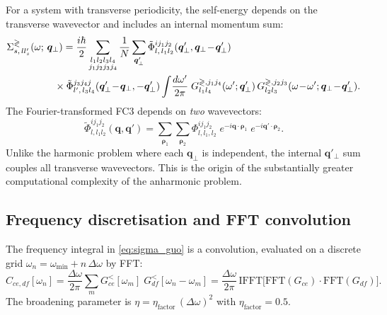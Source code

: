 \documentclass[11pt]{article}
\newcommand{\vc}[1]{\bm{#1}}
\newcommand{\vq}{\vc{q}}
\newcommand{\vrho}{\bm{\rho}}
\newcommand{\PhiT}{\tilde{\Phi}}
\newcommand{\dw}{\frac{d\omega'}{2\pi}}
\begin{document}
For a system with transverse periodicity, the self-energy depends on
the transverse wavevector and includes an internal momentum sum:
\begin{align}\label{eq:sigma_phph}
  \Sigma^{\gtrless}_{s,\,ll'_s}(&\omega;\,\vq_\perp)
  = \frac{i\hbar}{2}
    \sum_{\substack{l_1 l_2 l_3 l_4\\ j_1 j_2 j_3 j_4}}
    \frac{1}{N}\sum_{\vq'_\perp}
    \PhiT^{ij_1j_2}_{l,\,l_1 l_2}
      \!\left(\vq'_\perp,\vq_\perp\!-\!\vq'_\perp\right)
    \notag\\
  &\qquad\times
    \PhiT^{j_3j_4j}_{l',\,l_3 l_4}
      \!\left(\vq'_\perp\!-\!\vq_\perp,-\vq'_\perp\right)
    \int\!\dw\;
    G^{\gtrless,j_1j_4}_{l_1l_4}(\omega';\vq'_\perp)\,
    G^{\gtrless,j_2j_3}_{l_2l_3}
      (\omega\!-\!\omega';\vq_\perp\!-\!\vq'_\perp).
\end{align}
The Fourier-transformed FC3 depends on \emph{two} wavevectors:
\begin{equation}\label{eq:fc3_fourier}
  \PhiT^{ij_1j_2}_{l,l_{1}l_{2}}(\vq,\vq')
  = \sum_{\vrho_1}\sum_{\vrho_2}
  \Phi^{ij_1j_2}_{l,l_1,l_2}\;
  e^{-i\vq\cdot\vrho_1}\;e^{-i\vq'\cdot\vrho_2}.
\end{equation}
Unlike the harmonic problem where each $\vq_\perp$ is independent, the
internal $\vq'_\perp$ sum couples all transverse wavevectors.  This is
the origin of the substantially greater computational complexity of the
anharmonic problem.

\subsection{Frequency discretisation and FFT convolution}
\label{sec:fft}

The frequency integral in \cref{eq:sigma_guo} is a convolution,
evaluated on a discrete grid
$\omega_n = \omega_\mathrm{min} + n\,\Delta\omega$ by FFT:
\begin{equation}
  C_{ce,df}[\omega_n]
  = \frac{\Delta\omega}{2\pi}
    \sum_m
    G^<_{ce}[\omega_m]\;G^<_{df}[\omega_n - \omega_m]
  = \frac{\Delta\omega}{2\pi}\,
    \mathrm{IFFT}\!\bigl[
      \mathrm{FFT}(G_{ce})\cdot \mathrm{FFT}(G_{df})
    \bigr].
\end{equation}
The broadening parameter is $\eta = \eta_\mathrm{factor}\,(\Delta\omega)^2$
with $\eta_\mathrm{factor} = 0.5$.


\end{document}
